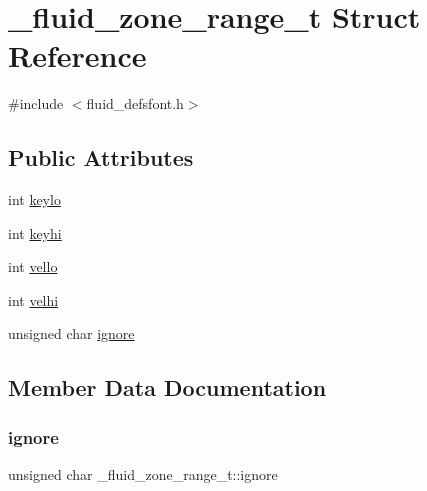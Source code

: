 \hypertarget{struct__fluid__zone__range__t}{}\section{\+\_\+fluid\+\_\+zone\+\_\+range\+\_\+t Struct Reference}
\label{struct__fluid__zone__range__t}


{\ttfamily \#include $<$fluid\+\_\+defsfont.\+h$>$}

\subsection*{Public Attributes}
\begin{DoxyCompactItemize}
\item 
int \hyperlink{struct__fluid__zone__range__t_a88c9f4ae016fb8aa54e473fa382c428b}{keylo}
\item 
int \hyperlink{struct__fluid__zone__range__t_abc9841a37316d044590a024cb24f5935}{keyhi}
\item 
int \hyperlink{struct__fluid__zone__range__t_ac3967fb25b3a00eddbc7e53174295791}{vello}
\item 
int \hyperlink{struct__fluid__zone__range__t_a20a747a31f8f6a1d4d127610de034b67}{velhi}
\item 
unsigned char \hyperlink{struct__fluid__zone__range__t_a651990086ce77712dddfe8cdeea82995}{ignore}
\end{DoxyCompactItemize}


\subsection{Member Data Documentation}
\mbox{\label{struct__fluid__zone__range__t_a651990086ce77712dddfe8cdeea82995}} 
\subsubsection{\texorpdfstring{ignore}{ignore}}
{\footnotesize\ttfamily unsigned char \+\_\+fluid\+\_\+zone\+\_\+range\+\_\+t\+::ignore}

\mbox{\label{struct__fluid__zone__range__t_abc9841a37316d044590a024cb24f5935}} 
